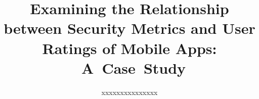 \documentclass{sig-alternate}
\newif\ifisnopii
\begin{document}
\title{Examining the Relationship between Security Metrics and User Ratings of Mobile Apps: ~A~Case~Study}


\ifisnopii %
\author{
%
\alignauthor
Daniel E. Krutz, and Andrew Meneely\\ 	
	\affaddr{Software Engineering Department}\\
       \affaddr{Rochester Institute of Technology}\\
       \affaddr{1 Lomb Memorial Drive}\\
       \affaddr{Rochester, NY, USA} \\
       \email{\{dxkvse, axmvse\}@rit.edu}
       \alignauthor
} %

\else %
\author{
%
\alignauthor
xxxxxxxxxxxxxxx\\ 	
	\\
       \\
       \\
        \\
       \alignauthor
} %
\fi %


\maketitle
\end{document}
